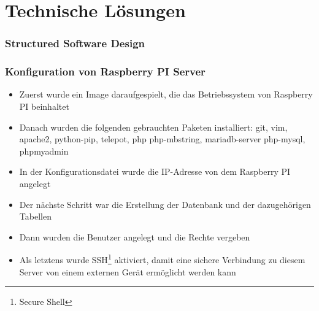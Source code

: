 \section{Technische Lösungen}
\subsubsection{Structured Software Design}
\subsubsection{Konfiguration von Raspberry PI Server}
\begin{itemize}
	\item Zuerst wurde ein Image daraufgespielt, die das Betriebssystem von Raspberry PI beinhaltet
\end{itemize}
\begin{itemize}
	\item Danach wurden die folgenden gebrauchten Paketen installiert: git, vim, apache2, python-pip, telepot, php php-mbstring, mariadb-server php-mysql, phpmyadmin
\end{itemize}
\begin{itemize}
	\item In der Konfigurationsdatei wurde die IP-Adresse von dem Raspberry PI angelegt
\end{itemize}
\begin{itemize}
	\item Der nächste Schritt war die Erstellung der Datenbank und der dazugehörigen Tabellen
\end{itemize}
\begin{itemize}
	\item Dann wurden die Benutzer angelegt und die Rechte vergeben
\end{itemize}
\begin{itemize}
	\item Als letztens wurde SSH\footnote{Secure Shell} aktiviert, damit eine sichere Verbindung zu diesem Server von einem externen Gerät ermöglicht werden kann
\end{itemize}
